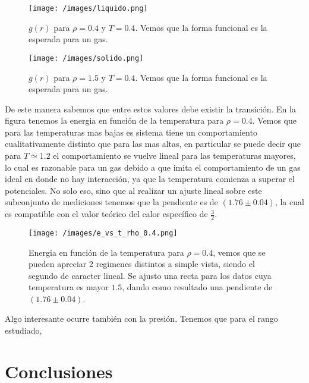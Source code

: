 \documentclass[%
 reprint,
 amsmath,amssymb,
 aps,
]{revtex4-1}
\begin{document}
\begin{figure}
  \begin{center}
  \texttt{[image: /images/liquido.png]}
  \caption{$g(r)$ para $\rho = 0.4$ y $T = 0.4$. Vemos que la forma funcional
  es la esperada para un gas.}
  \label{liquido}
\end{center}
\end{figure}

\begin{figure}
  \begin{center}
  \texttt{[image: /images/solido.png]}
  \caption{$g(r)$ para $\rho = 1.5$ y $T = 0.4$. Vemos que la forma funcional
  es la esperada para un gas.}
  \label{solido}
\end{center}
\end{figure}

De este manera sabemos que entre estos valores debe existir la transici\'on. En
la figura \label{e_vs_t_rho_0.4} tenemos la energia en funci\'on de la
temperatura para $\rho = 0.4$. Vemos que para las temperaturas mas bajas es
sistema tiene un comportamiento cualitativamente distinto que para las mas
altas, en particular se puede decir que para $T \simeq 1.2$ el comportamiento
se vuelve lineal para las temperaturas mayores, lo cual es razonable para un
gas debido a que imita el comportamiento de un gas ideal en donde no hay
interacci\'on, ya que la temperatura comienza a superar el potenciales. No solo
eso, sino que al realizar un ajuste lineal sobre este subconjunto de mediciones
tenemos que la pendiente es de $(1.76 \pm 0.04)$, la cual es compatible con el
valor te\'orico del calor espec\'ifico de $\frac{3}{2}$.

\begin{figure}
  \begin{center}
  \texttt{[image: /images/e\_vs\_t\_rho\_0.4.png]}
  \caption{Energia en funci\'on de la temperatura para $\rho = 0.4$, vemos que
  se pueden apreciar 2 regimenes distintos a simple vista, siendo el segundo de
  caracter lineal. Se ajusto una recta para los datos cuya temperatura es
  mayor $1.5$, dando como resultado una pendiente de $(1.76 \pm 0.04)$.}
  \label{e_vs_t_rho_0.4}
\end{center}
\end{figure}

Algo interesante ocurre tambi\'en con la presi\'on. Tenemos que para el rango
estudiado, 

\section{Conclusiones}

\appendix
\end{document}

